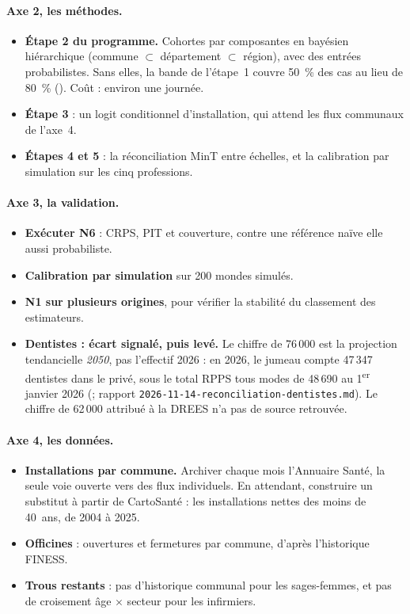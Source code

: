 \paragraph{Axe 2, les méthodes.}
\begin{itemize}
  \item \textbf{Étape 2 du programme.} Cohortes par composantes en bayésien hiérarchique
        (commune $\subset$ département $\subset$ région), avec des entrées probabilistes.
        Sans elles, la bande de l'étape~1 couvre 50~\% des cas au lieu de 80~\% (\mesure).
        Coût : environ une journée.
  \item \textbf{Étape 3} : un logit conditionnel d'installation, qui attend les flux
        communaux de l'axe~4.
  \item \textbf{Étapes 4 et 5} : la réconciliation MinT entre échelles, et la calibration par
        simulation sur les cinq professions.
\end{itemize}

\paragraph{Axe 3, la validation.}
\begin{itemize}
  \item \textbf{Exécuter N6} : CRPS, PIT et couverture, contre une référence naïve elle aussi
        probabiliste.
  \item \textbf{Calibration par simulation} sur 200 mondes simulés.
  \item \textbf{N1 sur plusieurs origines}, pour vérifier la stabilité du classement des
        estimateurs.
  \item \textbf{Dentistes : écart signalé, puis levé.} Le chiffre de 76\,000 est la projection
        tendancielle \emph{2050}, pas l'effectif 2026 : en 2026, le jumeau compte 47\,347 dentistes
        dans le privé, sous le total RPPS tous modes de 48\,690 au 1\textsuperscript{er} janvier 2026
        (\mesure ; rapport \texttt{2026-11-14-reconciliation-dentistes.md}). Le chiffre de 62\,000
        attribué à la DREES n'a pas de source retrouvée.
\end{itemize}

\paragraph{Axe 4, les données.}
\begin{itemize}
  \item \textbf{Installations par commune.} Archiver chaque mois l'Annuaire Santé, la seule voie
        ouverte vers des flux individuels. En attendant, construire un substitut à partir de
        CartoSanté : les installations nettes des moins de 40~ans, de 2004 à 2025.
  \item \textbf{Officines} : ouvertures et fermetures par commune, d'après l'historique FINESS.
  \item \textbf{Trous restants} : pas d'historique communal pour les sages-femmes, et pas de
        croisement âge $\times$ secteur pour les infirmiers.
\end{itemize}

